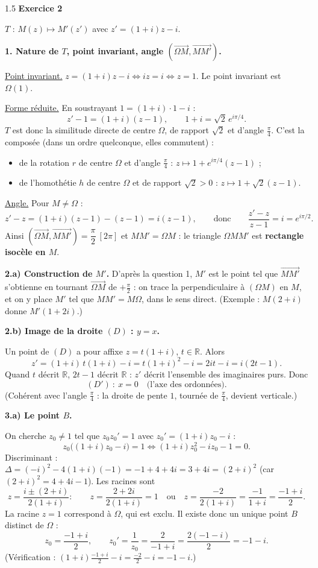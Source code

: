 \documentclass[12pt]{article}
\begin{document}
\begin{spacing}{1.5}
\medskip\textbf{Exercice 2}

$T$ : $M(z)\mapsto M'(z')$ avec $z'=(1+i)z-i$.

\textbf{1. Nature de $T$, point invariant, angle $(\overrightarrow{\Omega M},\overrightarrow{MM'})$.}

\underline{Point invariant.} $z=(1+i)z-i\iff iz=i\iff z=1$. Le point invariant est $\boxed{\Omega(1)}$.

\underline{Forme réduite.} En soustrayant $1=(1+i)\cdot1-i$ :
\[
z'-1=(1+i)(z-1),\qquad 1+i=\sqrt2\,e^{i\pi/4}.
\]
$T$ est donc la similitude directe de centre $\Omega$, de rapport $\sqrt2$ et d'angle $\frac\pi4$. C'est la composée (dans un ordre quelconque, elles commutent) :
\begin{itemize}
\item de la rotation $r$ de centre $\Omega$ et d'angle $\frac\pi4$ : $z\mapsto 1+e^{i\pi/4}(z-1)$ ;
\item de l'homothétie $h$ de centre $\Omega$ et de rapport $\sqrt2>0$ : $z\mapsto1+\sqrt2(z-1)$.
\end{itemize}

\underline{Angle.} Pour $M\neq\Omega$ :
\[
z'-z=(1+i)(z-1)-(z-1)=i(z-1),\qquad\text{donc}\qquad\frac{z'-z}{z-1}=i=e^{i\pi/2}.
\]
Ainsi $\boxed{(\overrightarrow{\Omega M},\overrightarrow{MM'})=\dfrac\pi2\ [2\pi]}$ et $MM'=\Omega M$ : le triangle $\Omega MM'$ est \textbf{rectangle isocèle en $M$}.

\textbf{2.a) Construction de $M'$.} D'après la question 1, $M'$ est le point tel que $\overrightarrow{MM'}$ s'obtienne en tournant $\overrightarrow{\Omega M}$ de $+\frac\pi2$ : on trace la perpendiculaire à $(\Omega M)$ en $M$, et on y place $M'$ tel que $MM'=M\Omega$, dans le sens direct. (Exemple : $M(2+i)$ donne $M'(1+2i)$.)

\textbf{2.b) Image de la droite $(D)$ : $y=x$.}

Un point de $(D)$ a pour affixe $z=t(1+i)$, $t\in\mathbb{R}$. Alors
\[
z'=(1+i)\,t(1+i)-i=t(1+i)^2-i=2it-i=i(2t-1).
\]
Quand $t$ décrit $\mathbb{R}$, $2t-1$ décrit $\mathbb{R}$ : $z'$ décrit l'ensemble des imaginaires purs. Donc
\[
\boxed{(D')\ :\ x=0}\quad\text{(l'axe des ordonnées).}
\]
(Cohérent avec l'angle $\frac\pi4$ : la droite de pente $1$, tournée de $\frac\pi4$, devient verticale.)

\textbf{3.a) Le point $B$.}

On cherche $z_0\neq1$ tel que $z_0z_0'=1$ avec $z_0'=(1+i)z_0-i$ :
\[
z_0\big((1+i)z_0-i\big)=1\iff(1+i)z_0^2-iz_0-1=0 .
\]
Discriminant : $\Delta=(-i)^2-4(1+i)(-1)=-1+4+4i=3+4i=(2+i)^2$ (car $(2+i)^2=4+4i-1$). Les racines sont
\[
z=\frac{i\pm(2+i)}{2(1+i)}:\qquad z=\frac{2+2i}{2(1+i)}=1\quad\text{ou}\quad z=\frac{-2}{2(1+i)}=\frac{-1}{1+i}=\frac{-1+i}{2}.
\]
La racine $z=1$ correspond à $\Omega$, qui est exclu. Il existe donc un unique point $B$ distinct de $\Omega$ :
\[
\boxed{z_0=\frac{-1+i}{2}},\qquad z_0'=\frac1{z_0}=\frac{2}{-1+i}=\frac{2(-1-i)}{2}=\boxed{-1-i}.
\]
(Vérification : $(1+i)\frac{-1+i}{2}-i=\frac{-2}{2}-i=-1-i$.)


\end{spacing}
\end{document}
